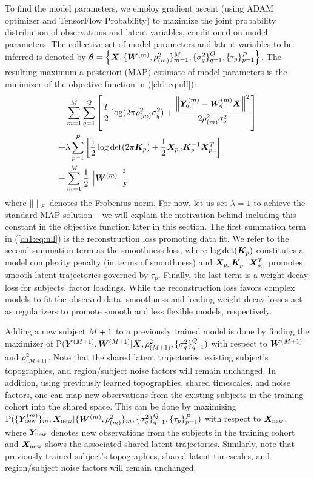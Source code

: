To find the model parameters, we employ gradient ascent (using ADAM optimizer \cite{adam} and TensorFlow Probability) to maximize the joint probability distribution of observations and latent variables, conditioned on model parameters. The collective set of model parameters and latent variables to be inferred is denoted by $\bm{\theta}=\left\{ \bm{X}, \{\bm{W}^{(m)}, \rho_{(m)}^2\}_{m=1}^M, \{\sigma_{q}^2\}_{q=1}^Q, \{\tau_p\}_{p=1}^P \right\}$. The resulting maximum a posteriori (MAP) estimate of model parameters is the minimizer of the objective function in (\ref{ch1:eq:nll}):
\begin{align}
    & \sum_{m=1}^{M} \sum_{q=1}^{Q} \left[ \frac{T}{2} \log(2\pi\rho_{(m)}^2\sigma_{q}^2) + \frac{\left\lVert \bm{Y}^{(m)}_{q,:} - \bm{W}^{(m)}_{q,:} \bm{X} \right\rVert^2}{2\rho_{(m)}^2\sigma_{q}^2} \right]  \nonumber \\
    + & \lambda \sum_{p=1}^{P} \left[ \frac{1}{2}\log\det(2\pi \bm{K}_{p}) + \frac{1}{2}\bm{X}_{p,:} \bm{K}_{p}^{-1} \bm{X}_{p,:}^T \right] \nonumber \\
    + & \sum_{m=1}^{M} \frac{1}{2} \left\lVert\bm{W}^{(m)}\right\rVert_F^2 
    \label{ch1:eq:nll}
\end{align}
where $\left\lVert\cdot\right\rVert_F$ denotes the Frobenius norm. For now, let us set $\lambda=1$ to achieve the standard MAP solution -- we will explain the motivation behind including this constant in the objective function later in this section. The first summation term in (\ref{ch1:eq:nll}) is the reconstruction loss promoting data fit. We refer to the second summation term as the smoothness loss, where $\log\det(\bm{K}_p)$ constitutes a model complexity penalty (in terms of smoothness) and $\bm{X}_{p,:} \bm{K}_{p}^{-1} \bm{X}_{p,:}^T$ promotes smooth latent trajectories governed by $\tau_p$. Finally, the last term is a weight decay loss for subjects' factor loadings. While the reconstruction loss favors complex models to fit the observed data, smoothness and loading weight decay losses act as regularizers to promote smooth and less flexible models, respectively.

Adding a new subject $M+1$ to a previously trained model is done by finding the maximizer of $\text{P}(\bm{Y}^{(M+1)}, \bm{W}^{(M+1)} | \bm{X}, \rho_{(M+1)}^2,  \{\sigma_{q}^2\}_{q=1}^Q)$ with respect to $\bm{W}^{(M+1)}$ and $\rho_{(M+1)}^2$. Note that the shared latent trajectories, existing subject's topographies, and region/subject noise factors will remain unchanged.
In addition, using previously learned topographies, shared timescales, and noise factors, one can map new observations from the existing subjects in the training cohort into the shared space. This can be done by maximizing 
$\text{P}(\{\bm{Y}_{\text{new}}^{(m)}\}_{m}, \bm{X}_{\text{new}} | \{\bm{W}^{(m)}, \rho_{(m)}^2\}_{m}, \{\sigma_{q}^2\}_{q=1}^Q, \{\tau_p\}_{p=1}^P)$
with respect to $\bm{X}_{\text{new}}$, where $\bm{Y}_{\text{new}}$ denotes new observations from the subjects in the training cohort and $\bm{X}_{\text{new}}$ shows the associated shared latent trajectories. Similarly, note that previously trained subject's topographies, shared latent timescales, and region/subject noise factors will remain unchanged.

